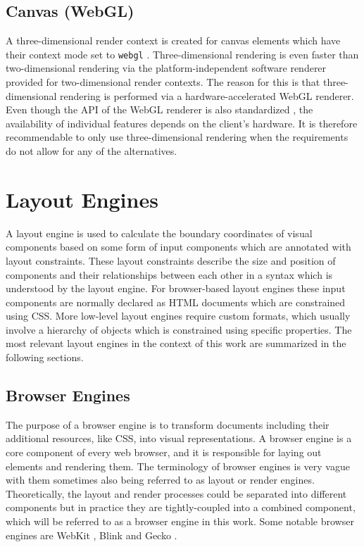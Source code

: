 \subsection{Canvas (WebGL)}
\label{sec:CanvasWebGL}

A three-dimensional render context is created for canvas elements which have their context mode set to \lstinline{webgl} .
Three-dimensional rendering is even faster than two-dimensional rendering via the platform-independent software renderer provided for two-dimensional render contexts.
The reason for this is that three-dimensional rendering is performed via a hardware-accelerated WebGL renderer.
Even though the API of the WebGL renderer is also standardized \parencite{WebGL}, the availability of individual features depends on the client's hardware.
It is therefore recommendable to only use three-dimensional rendering when the requirements do not allow for any of the alternatives.

\section{Layout Engines}

A layout engine is used to calculate the boundary coordinates of visual components based on some form of input components which are annotated with layout constraints. 
These layout constraints describe the size and position of components and their relationships between each other in a syntax which is understood by the layout engine. 
For browser-based layout engines these input components are normally declared as HTML documents which are constrained using CSS. 
More low-level layout engines require custom formats, which usually involve a hierarchy of objects which is constrained using specific properties. 
The most relevant layout engines in the context of this work are summarized in the following sections.

\subsection{Browser Engines}
\label{sec:BrowserEngines}

The purpose of a browser engine is to transform documents including their additional resources, like CSS, into visual representations. 
A browser engine is a core component of every web browser, and it is responsible for laying out elements and rendering them. 
The terminology of browser engines is very vague with them sometimes also being referred to as layout or render engines. 
Theoretically, the layout and render processes could be separated into different components but in practice they are tightly-coupled into a combined component, which will be referred to as a browser engine in this work. 
Some notable browser engines are WebKit \parencite{WebKit}, Blink \parencite{Blink} and Gecko \parencite{Gecko}.

